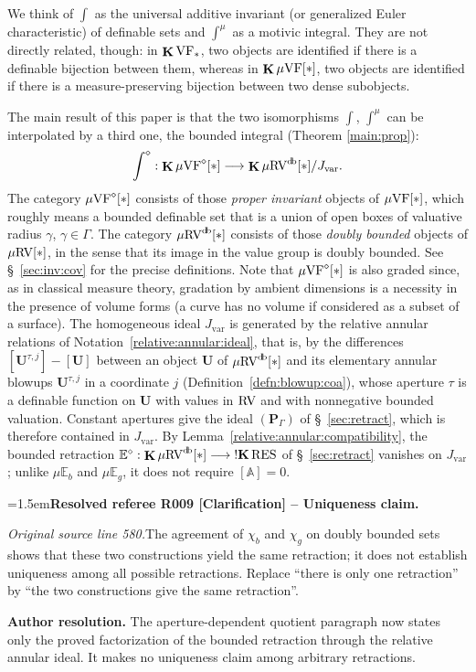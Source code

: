 \documentclass[12pt]{amsart}
\newcommand{\ResolvedRefereeRemark}[5]{%
  \par\medskip\begingroup\normalfont\small\color{gray}%
  \emergencystretch=1.5em\noindent\textbf{Resolved referee R#1 [#2] -- #3.}\par\nobreak\noindent #4\par
  \medskip\color{ResolutionGreen}\noindent\textbf{Author resolution.} #5\par
  \endgroup\medskip
}
\newcommand{\memph}[1]{{\color{magenta}\emph{#1}}}
\theoremstyle{plain}
\theoremstyle{definition}
\theoremstyle{remark}
\numberwithin{equation}{section}
\theoremstyle{plain}
\newcommand{\VF}{\textup{VF}}
\newcommand{\RV}{\textup{RV}}
\newcommand{\A}{\mathds{A}}
\newcommand{\0}{\emptyset}
\newcommand{\bb}[1]{\mathbb{#1}}
\newcommand{\fun}{\longrightarrow}
\newcommand{\mgVF}{{\mu} {\VF}}
\newcommand{\mgRV}{{\mu}{\RV}}
\newcommand{\RES}{\textup{RES}}
\newcommand{\mgE}{{\mu}{\bb E}}
\DeclareMathOperator{\ggk}{\mathbf{K}}
\DeclareMathOperator{\sggk}{!\mathbf{K}}
\DeclareMathOperator{\db}{d \! b}
\begin{document}
We think of $\int$ as the universal additive invariant (or generalized Euler characteristic) of definable sets and $\int^\mu$ as a motivic integral. They are not directly related, though: in  $\ggk\VF_*$, two objects are identified if there is a definable bijection between them, whereas in $\ggk\mgVF[*]$, two objects are identified if there is a measure-preserving bijection between two dense subobjects.


The main result of this paper is  that the two isomorphisms $\int$, $\int^\mu$ can be interpolated by a third one, the bounded integral (Theorem \ref{main:prop}):
\[
\int^\diamond : \ggk \mgVF^\diamond[*] \fun \ggk  \mgRV^{\db}[*] / J_{\mathrm{var}}.
\]
The category $\mgVF^\diamond[*]$ consists of those \memph{proper invariant} objects of $\mgVF[*]$, which roughly means a bounded definable set that is a union of open boxes of valuative radius $\gamma$, $\gamma \in \Gamma$. The category $\mgRV^{\db}[*]$ consists of those \memph{doubly bounded} objects of $\mgRV[*]$, in the sense that its image in the value group is doubly bounded. See \S~\ref{sec:inv:cov} for the precise definitions. Note that $\mgVF^{\diamond}[*]$  is also graded since, as in classical measure theory, gradation by ambient dimensions is a necessity in the presence of volume forms (a curve has no volume if considered as a subset of a surface). The homogeneous ideal $J_{\mathrm{var}}$ is generated by the relative annular relations of Notation~\ref{relative:annular:ideal}, that is, by the differences $[\bm U^{\tau, j}] - [\bm U]$ between an object $\bm U$ of $\mgRV^{\db}[*]$ and its elementary annular blowups $\bm U^{\tau, j}$ in a coordinate $j$ (Definition~\ref{defn:blowup:coa}), whose aperture $\tau$ is a definable function on $\bm U$ with values in $\RV$ and with nonnegative bounded valuation. Constant apertures give the ideal $(\bm P_\Gamma)$ of \S~\ref{sec:retract}, which is therefore contained in $J_{\mathrm{var}}$. By Lemma~\ref{relative:annular:compatibility}, the bounded retraction $\bb E^\diamond : \ggk \mgRV^{\db}[*] \fun \sggk \RES$ of \S~\ref{sec:retract} vanishes on $J_{\mathrm{var}}$; unlike $\mgE_{b}$ and $\mgE_{g}$, it does not require $[\A] = 0$.

\ResolvedRefereeRemark{009}{Clarification}{Uniqueness claim}{%
\textit{Original source line 580.}\quad The agreement of $\chi_b$ and $\chi_g$ on doubly bounded sets shows that these two constructions yield the same retraction; it does not establish uniqueness among all possible retractions. Replace ``there is only one retraction'' by ``the two constructions give the same retraction''. 
}{The aperture-dependent quotient paragraph now states only the proved factorization of the bounded retraction through the relative annular ideal. It makes no uniqueness claim among arbitrary retractions.}
\end{document}
